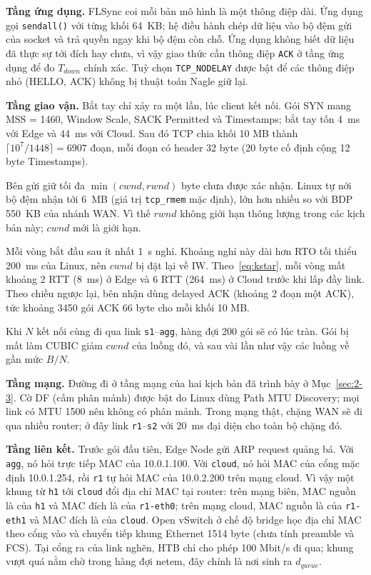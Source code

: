 \textbf{Tầng ứng dụng.} FLSync coi mỗi bản mô hình là một thông điệp dài. Ứng dụng gọi \texttt{sendall()} với từng khối 64~KB; hệ điều hành chép dữ liệu vào bộ đệm gửi của socket và trả quyền ngay khi bộ đệm còn chỗ. Ứng dụng không biết dữ liệu đã thực sự tới đích hay chưa, vì vậy giao thức cần thông điệp \texttt{ACK} ở tầng ứng dụng để đo $T_{down}$ chính xác. Tuỳ chọn \texttt{TCP\_NODELAY} được bật để các thông điệp nhỏ (HELLO, ACK) không bị thuật toán Nagle giữ lại.

\textbf{Tầng giao vận.} Bắt tay chỉ xảy ra một lần, lúc client kết nối. Gói SYN mang MSS = 1460, Window Scale, SACK Permitted và Timestamps; bắt tay tốn 4~ms với Edge và 44~ms với Cloud. Sau đó TCP chia khối 10 MB thành $\lceil 10^7 / 1448 \rceil = 6907$ đoạn, mỗi đoạn có header 32 byte (20 byte cố định cộng 12 byte Timestamps).

Bên gửi giữ tối đa $\min(cwnd, rwnd)$ byte chưa được xác nhận. Linux tự nới bộ đệm nhận tới 6~MB (giá trị \texttt{tcp\_rmem} mặc định), lớn hơn nhiều so với BDP 550~KB của nhánh WAN. Vì thế $rwnd$ không giới hạn thông lượng trong các kịch bản này; $cwnd$ mới là giới hạn.

Mỗi vòng bắt đầu sau ít nhất 1~s nghỉ. Khoảng nghỉ này dài hơn RTO tối thiểu 200~ms của Linux, nên $cwnd$ bị đặt lại về IW. Theo~\eqref{eq:kstar}, mỗi vòng mất khoảng 2 RTT (8~ms) ở Edge và 6 RTT (264~ms) ở Cloud trước khi lấp đầy link. Theo chiều ngược lại, bên nhận dùng delayed ACK (khoảng 2 đoạn một ACK), tức khoảng 3450 gói ACK 66 byte cho mỗi khối 10 MB.

Khi $N$ kết nối cùng đi qua link \texttt{s1}--\texttt{agg}, hàng đợi 200 gói sẽ có lúc tràn. Gói bị mất làm CUBIC giảm $cwnd$ của luồng đó, và sau vài lần như vậy các luồng về gần mức $B/N$.

\textbf{Tầng mạng.} Đường đi ở tầng mạng của hai kịch bản đã trình bày ở Mục~\ref{sec:2-3}. Cờ DF (cấm phân mảnh) được bật do Linux dùng Path MTU Discovery; mọi link có MTU 1500 nên không có phân mảnh. Trong mạng thật, chặng WAN sẽ đi qua nhiều router; ở đây link \texttt{r1}--\texttt{s2} với 20~ms đại diện cho toàn bộ chặng đó.

\textbf{Tầng liên kết.} Trước gói đầu tiên, Edge Node gửi ARP request quảng bá. Với \texttt{agg}, nó hỏi trực tiếp MAC của 10.0.1.100. Với \texttt{cloud}, nó hỏi MAC của cổng mặc định 10.0.1.254, rồi \texttt{r1} tự hỏi MAC của 10.0.2.200 trên mạng cloud. Vì vậy một khung từ \texttt{h1} tới \texttt{cloud} đổi địa chỉ MAC tại router: trên mạng biên, MAC nguồn là của \texttt{h1} và MAC đích là của \texttt{r1-eth0}; trên mạng cloud, MAC nguồn là của \texttt{r1-eth1} và MAC đích là của \texttt{cloud}. Open vSwitch ở chế độ bridge học địa chỉ MAC theo cổng vào và chuyển tiếp khung Ethernet 1514 byte (chưa tính preamble và FCS). Tại cổng ra của link nghẽn, HTB chỉ cho phép 100 Mbit/s đi qua; khung vượt quá nằm chờ trong hàng đợi netem, đây chính là nơi sinh ra $d_{queue}$.

